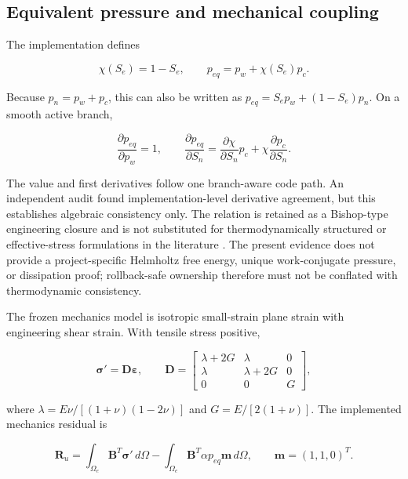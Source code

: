 \documentclass[preprint,12pt,authoryear]{elsarticle}
\begin{document}
\subsection{Equivalent pressure and mechanical coupling}

The implementation defines

\begin{equation}
\chi(S_e)=1-S_e,
\qquad
p_{eq}=p_w+\chi(S_e)p_c.
\end{equation}

Because $p_n=p_w+p_c$, this can also be written as $p_{eq}=S_ep_w+(1-S_e)p_n$. On a smooth active branch,

\begin{equation}
\frac{\partial p_{eq}}{\partial p_w}=1,
\qquad
\frac{\partial p_{eq}}{\partial S_n}
=\frac{\partial\chi}{\partial S_n}p_c
+\chi\frac{\partial p_c}{\partial S_n}.
\end{equation}

The value and first derivatives follow one branch-aware code path. An independent audit found implementation-level derivative agreement, but this establishes algebraic consistency only. The relation is retained as a Bishop-type engineering closure and is not substituted for thermodynamically structured or effective-stress formulations in the literature \citep{nuth2007,coussy2010,borja2004}. The present evidence does not provide a project-specific Helmholtz free energy, unique work-conjugate pressure, or dissipation proof; rollback-safe ownership therefore must not be conflated with thermodynamic consistency.

The frozen mechanics model is isotropic small-strain plane strain with engineering shear strain. With tensile stress positive,

\begin{equation}
\boldsymbol\sigma'=\mathbf{D}\boldsymbol\varepsilon,\qquad
\mathbf{D}=\begin{bmatrix}
\lambda+2G & \lambda & 0\\
\lambda & \lambda+2G & 0\\
0&0&G
\end{bmatrix},
\end{equation}

where $\lambda=E\nu/[(1+\nu)(1-2\nu)]$ and $G=E/[2(1+\nu)]$. The implemented mechanics residual is

\begin{equation}
\mathbf{R}_u=\int_{\Omega_e}\mathbf{B}^{T}\boldsymbol\sigma'\,d\Omega
-\int_{\Omega_e}\mathbf{B}^{T}\alpha p_{eq}\mathbf{m}\,d\Omega,
\qquad \mathbf{m}=(1,1,0)^T.
\end{equation}
\end{document}
